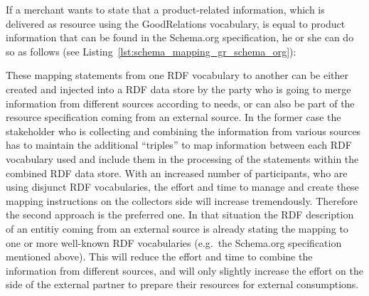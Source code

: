 If a merchant wants to state that a product-related information, which is delivered as resource using the GoodRelations vocabulary, is equal to product information that can be found in the Schema.org specification, he or she can do so as follows (see Listing~\ref{lst:schema_mapping_gr_schema_org}): \@


These mapping statements from one \gls{RDF} vocabulary to another can be either created and injected into a \gls{RDF} data store by the party who is going to merge information from different sources according to needs, or can also be part of the resource specification coming from an external source. In the former case the stakeholder who is collecting and combining the information from various sources has to maintain the additional ``triples'' to map information between each \gls{RDF} vocabulary used and include them in the processing of the statements within the combined \gls{RDF} data store. With an increased number of participants, who are using disjunct \gls{RDF} vocabularies, the effort and time to manage and create these mapping instructions on the collectors side will increase tremendously. Therefore the second approach is the preferred one. In that situation the \gls{RDF} description of an entitiy coming from an external source is already stating the mapping to one or more well-known \gls{RDF} vocabularies (e.g.\ the Schema.org specification mentioned above). This will reduce the effort and time to combine the information from different sources, and will only slightly increase the effort on the side of the external partner to prepare their resources for external consumptions.


